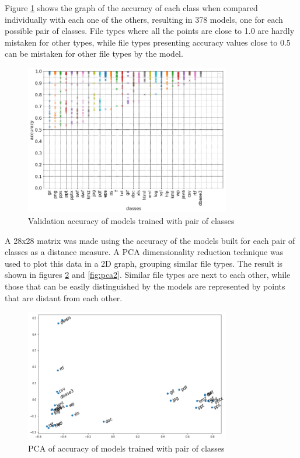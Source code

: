 
Figure \ref{fig:dual} shows the graph of the accuracy of each class when compared individually with each one of the others, resulting in 378 models, one for each possible pair of classes. File types where all the points are close to 1.0 are hardly mistaken for other types, while file types presenting accuracy values close to 0.5 can be mistaken for other file types by the model.

\noindent
\begin{figure}[htb!]
\centering\includegraphics[width=0.8\textwidth]{content/dual.png}
\caption{\label{fig:dual}Validation accuracy of models trained with pair of classes}%
\end{figure}


A 28x28 matrix was made using the accuracy of the models built for each pair of classes as a distance measure. A PCA dimensionality reduction technique was used to plot this data in a 2D graph, grouping similar file types. The result is shown in figures \ref{fig:pca} and \ref{fig:pca2}. Similar file types are next to each other, while those that can be easily distinguished by the models are represented by points that are distant from each other.

\noindent
\begin{figure}[htb!]
\centering\includegraphics[width=0.8\textwidth]{content/pca.png}
\caption{\label{fig:pca}PCA of accuracy of models trained with pair of classes}%
\end{figure}


